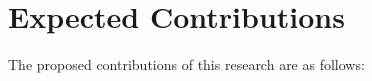 

\section{Expected Contributions}
The proposed contributions of this research are as follows:


% 

